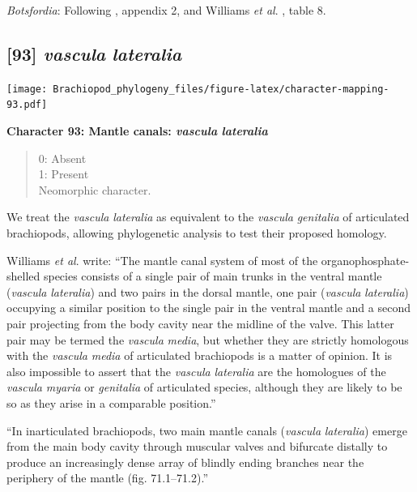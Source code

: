 \documentclass[openany]{book}
\theoremstyle{definition}
\theoremstyle{definition}
\theoremstyle{definition}
\theoremstyle{remark}
\begin{document}
\emph{Botsfordia}: Following \citet{Williams1998Thediversity}, appendix
2, and Williams \emph{et al}.
\citeyearpar{Williams2000BrachiopodaLinguliformea}, table 8.

\hypertarget{vascula-lateralia}{%
\subsection*{\texorpdfstring{{[}93{]} \emph{vascula}
\emph{lateralia}}{{[}93{]} vascula lateralia}}\label{vascula-lateralia}}

\texttt{[image: Brachiopod\_phylogeny\_files/figure-latex/character-mapping-93.pdf]}

\textbf{Character 93: Mantle canals: \emph{vascula} \emph{lateralia}}

\begin{quote}
0: Absent\\
1: Present\\
Neomorphic character.
\end{quote}

We treat the \emph{vascula} \emph{lateralia} as equivalent to the
\emph{vascula} \emph{genitalia} of articulated brachiopods, allowing
phylogenetic analysis to test their proposed homology.

Williams \emph{et al}. \citeyearpar{Williams1997BrachiopodaRevised}
write: ``The mantle canal system of most of the organophosphate-shelled
species consists of a single pair of main trunks in the ventral mantle
(\emph{vascula} \emph{lateralia}) and two pairs in the dorsal mantle,
one pair (\emph{vascula} \emph{lateralia}) occupying a similar position
to the single pair in the ventral mantle and a second pair projecting
from the body cavity near the midline of the valve. This latter pair may
be termed the \emph{vascula} \emph{media}, but whether they are strictly
homologous with the \emph{vascula} \emph{media} of articulated
brachiopods is a matter of opinion. It is also impossible to assert that
the \emph{vascula} \emph{lateralia} are the homologues of the
\emph{vascula} \emph{myaria} or \emph{genitalia} of articulated species,
although they are likely to be so as they arise in a comparable
position.''

``In inarticulated brachiopods, two main mantle canals (\emph{vascula}
\emph{lateralia}) emerge from the main body cavity through muscular
valves and bifurcate distally to produce an increasingly dense array of
blindly ending branches near the periphery of the mantle (fig.
71.1--71.2).''
\end{document}
